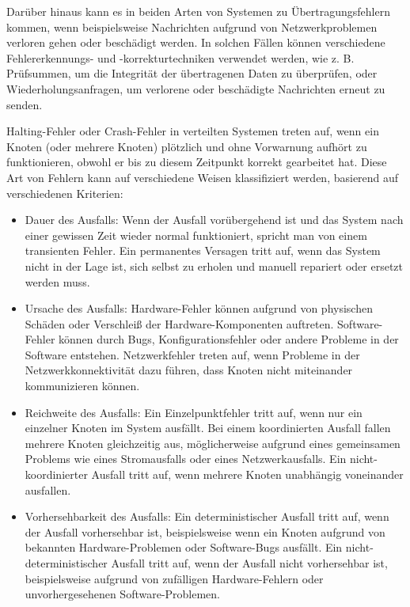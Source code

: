 Darüber hinaus kann es in beiden Arten von Systemen zu Übertragungsfehlern kommen, wenn beispielsweise Nachrichten aufgrund von Netzwerkproblemen verloren gehen oder beschädigt werden. In solchen Fällen können verschiedene Fehlererkennungs- und -korrekturtechniken verwendet werden, wie z. B. Prüfsummen, um die Integrität der übertragenen Daten zu überprüfen, oder Wiederholungsanfragen, um verlorene oder beschädigte Nachrichten erneut zu senden.

Halting-Fehler oder Crash-Fehler in verteilten Systemen treten auf, wenn ein Knoten (oder mehrere Knoten) plötzlich und ohne Vorwarnung aufhört zu funktionieren, obwohl er bis zu diesem Zeitpunkt korrekt gearbeitet hat. Diese Art von Fehlern kann auf verschiedene Weisen klassifiziert werden, basierend auf verschiedenen Kriterien:
\begin{itemize}
\item Dauer des Ausfalls: Wenn der Ausfall vorübergehend ist und das System nach einer gewissen Zeit wieder normal funktioniert, spricht man von einem transienten Fehler. Ein permanentes Versagen tritt auf, wenn das System nicht in der Lage ist, sich selbst zu erholen und manuell repariert oder ersetzt werden muss.
\item Ursache des Ausfalls: Hardware-Fehler können aufgrund von physischen Schäden oder Verschleiß der Hardware-Komponenten auftreten. Software-Fehler können durch Bugs, Konfigurationsfehler oder andere Probleme in der Software entstehen. Netzwerkfehler treten auf, wenn Probleme in der Netzwerkkonnektivität dazu führen, dass Knoten nicht miteinander kommunizieren können.
\item Reichweite des Ausfalls: Ein Einzelpunktfehler tritt auf, wenn nur ein einzelner Knoten im System ausfällt. Bei einem koordinierten Ausfall fallen mehrere Knoten gleichzeitig aus, möglicherweise aufgrund eines gemeinsamen Problems wie eines Stromausfalls oder eines Netzwerkausfalls. Ein nicht-koordinierter Ausfall tritt auf, wenn mehrere Knoten unabhängig voneinander ausfallen.
\item Vorhersehbarkeit des Ausfalls: Ein deterministischer Ausfall tritt auf, wenn der Ausfall vorhersehbar ist, beispielsweise wenn ein Knoten aufgrund von bekannten Hardware-Problemen oder Software-Bugs ausfällt. Ein nicht-deterministischer Ausfall tritt auf, wenn der Ausfall nicht vorhersehbar ist, beispielsweise aufgrund von zufälligen Hardware-Fehlern oder unvorhergesehenen Software-Problemen.
\end{itemize} 

